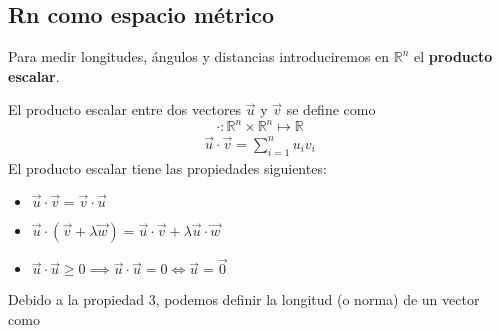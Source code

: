 \documentclass{../Calculo.tex}
\begin{document}
\subsection{Rn como espacio métrico}
Para medir longitudes, ángulos y distancias introduciremos en $\mathbb{R}^{n}$
el \textbf{producto escalar}.
\begin{defin}
	El producto escalar entre dos vectores $\vec{u}$ y $\vec{v}$ se define como
	\[
		\cdot : \mathbb{R}^{n} \times  \mathbb{R}^{n} \mapsto \mathbb{R}
	\]
	\begin{equation}
		\begin{split}
			\vec{u} \cdot  \vec{v} = \sum_{i=1}^{n} u_{i}v_{i}
		\end{split}
	\end{equation}
	El producto escalar tiene las propiedades siguientes:
	\begin{itemize}
		\item $\vec{u} \cdot  \vec{v} = \vec{v} \cdot \vec{u}$
		\item $\vec{u} \cdot (\vec{v}+\lambda\vec{w})= 
			\vec{u} \cdot \vec{v} + \lambda \vec{u} \cdot \vec{w}$
		\item $\vec{u} \cdot \vec{u} \geq 0 \implies \vec{u} \cdot \vec{u}=0
			\iff \vec{u} = \vec{0}$ 
	\end{itemize}
\end{defin}
Debido a la propiedad 3, podemos definir la longitud (o norma) de un vector como
\end{document}
